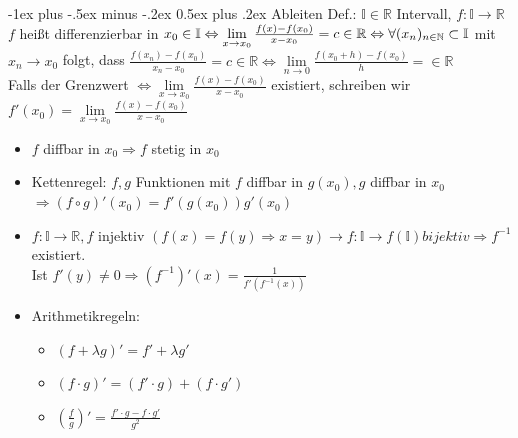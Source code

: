 \documentclass[12pt,a4paper^, twocolumn]{article}
\makeatletter
\newcommand{\R}{\mathbb{R}}
\newcommand{\N}{\mathbb{N}}
\newcommand{\I}{\mathbb{I}}
\renewcommand{\section}{\@startsection{section}{1}{0mm}%
                                {-1ex plus -.5ex minus -.2ex}%
                                {0.5ex plus .2ex}%
                                {\normalfont\large\bfseries}}
\makeatother
\begin{document}
\section{Ableiten}
	Def.: $\I \in \R$ Intervall, $f: \I \to \R$ \\
	$f$ heißt differenzierbar in $x_0 \in \I \\
	\Leftrightarrow \lim\limits_{x \to x_0} \frac{f(x) - f(x_0)}{x - x_0} = c \in \R \\
	\Leftrightarrow \forall (x_n)_{n \in \N} \subset \I$ mit $x_n \to x_0$ folgt, dass $\frac{f(x_n) - f(x_0)}{x_n-x_0} = c \in \R
	\Leftrightarrow \lim\limits_{n \to 0} \frac{f(x_0 + h)-f(x_0)}{h} = \in \R$ \\
	Falls der Grenzwert 
	$\Leftrightarrow \lim\limits_{x \to x_0} \frac{f(x) - f(x_0)}{x - x_0}$ existiert,
	schreiben wir $f'(x_0) = \lim\limits_{x \to x_0} \frac{f(x) - f(x_0)}{x - x_0}$
	\begin{itemize}
	\item $f$ diffbar in $x_0 \Rightarrow f$ stetig in $x_0$
	\item Kettenregel: $f,g$ Funktionen mit $f$ diffbar in $g(x_0), g$ diffbar in $x_0$
		$\Rightarrow (f \circ g)'(x_0) = f'(g(x_0))g'(x_0)$
	\item $f: \I \to \R, f$ injektiv $(f(x) = f(y) \Rightarrow x=y) \rightarrow f:\I \to f(\I) bijektiv \Rightarrow f^{-1}$ existiert. \\
		Ist $f'(y) \neq 0 \Rightarrow (f^{-1})'(x) = \frac{1}{f'(f^{-1}(x))}$
	\item Arithmetikregeln:
		\begin{itemize}
		\item $(f + \lambda g)' = f' + \lambda g'$
		\item $(f \cdot g)' = (f' \cdot g) + (f \cdot g')$
		\item $(\frac{f}{g})' = \frac{f'\cdot g - f \cdot g'}{g^2}$
		\end{itemize}
	\end{itemize}
\end{document}
